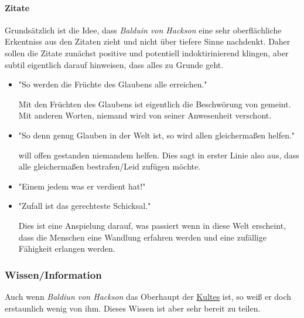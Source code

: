         \paragraph{Zitate}
            Grundsätzlich ist die Idee, dass \emph{Balduin von Hackson} eine sehr oberflächliche Erkentniss aus den Zitaten zieht und nicht über tiefere Sinne nachdenkt. Daher sollen die Zitate zunächst positive und potentiell indoktirinierend klingen, aber subtil eigentlich darauf hinweisen, dass alles zu Grunde geht.
            \begin{itemize}
                \item \begin{displayquote}
                        "So werden die Früchte des Glaubens alle erreichen."
                      \end{displayquote}
                    Mit den Früchten des Glaubens ist eigentlich die Beschwörung von  gemeint. Mit anderen Worten, niemand wird von seiner Anwesenheit verschont.

                \item \begin{displayquote}
                        "So denn genug Glauben in der Welt ist, so wird  allen gleichermaßen helfen."
                      \end{displayquote}
                     will offen gestanden niemandem helfen. Dies sagt in erster Linie also aus, dass  alle gleichermaßen bestrafen/Leid zufügen möchte.
                \item \begin{displayquote}
                        "Einem jedem was er verdient hat!"
                      \end{displayquote}
                \item \begin{displayquote}
                        "Zufall ist das gerechteste Schicksal."
                      \end{displayquote}
                      Dies ist eine Anspielung darauf, was passiert wenn  in diese Welt erscheint, dass die Menschen eine Wandlung erfahren werden und eine zufällige Fähigkeit erlangen werden.
            \end{itemize}


    \subsubsection{Wissen/Information}
        Auch wenn \emph{Baldiun von Hackson} das Oberhaupt der \hyperref[sons:kult-von-colthubor]{Kultes} ist, so weiß er doch erstaunlich wenig von ihm. Dieses Wissen ist aber sehr bereit zu teilen.

